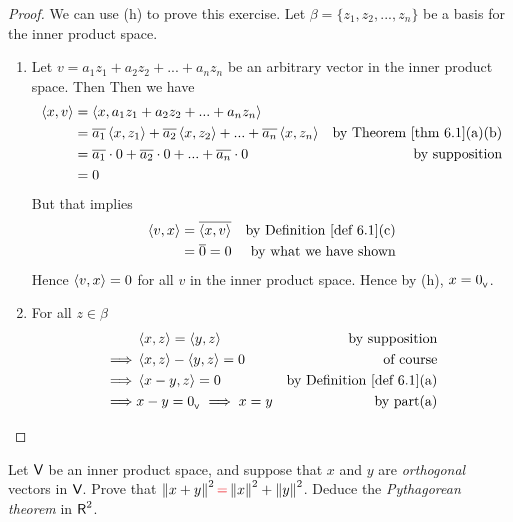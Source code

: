 \begin{proof}
We can use (h) to prove this exercise.
Let \(\beta = \{ z_1, z_2, ..., z_n \}\) be a basis for the inner product space.
\begin{enumerate}
\item Let \(v = a_1 z_1 + a_2 z_2 + ... + a_n z_n\) be an arbitrary vector in the inner product space.
Then Then we have
\begin{align*}
    \LG x, v \RG & = \LG x, a_1 z_1 + a_2 z_2 + ... + a_n z_n \RG \\
        & = \conjugatet{a_1} \LG x, z_1 \RG + \conjugatet{a_2} \LG x, z_2 \RG + ... + \conjugatet{a_n} \LG x, z_n \RG & \text{by \THM{6.1}(a)(b)} \\
        & = \conjugatet{a_1} \cdot 0 + \conjugatet{a_2} \cdot 0 + ... + \conjugatet{a_n} \cdot 0 & \text{by supposition} \\
        & = 0
\end{align*}
But that implies
\begin{align*}
    \LG v, x \RG & = \conjugatet{\LG x, v \RG} & \text{by \DEF{6.1}(c)} \\
        & = \conjugatet{0} = 0 & \text{by what we have shown}
\end{align*}
Hence \(\left< v, x \right> = 0\) for all \(v\) in the inner product space.
Hence by (h), \(x = 0_{_{\textsf{V}}}\).

\item For all \(z \in \beta\)
\begin{align*}
             & \LG x, z \RG = \LG y, z \RG & \text{by supposition} \\
    \implies & \LG x, z \RG - \LG y, z \RG = 0 & \text{of course} \\
    \implies & \LG x - y, z \RG = 0 & \text{by \DEF{6.1}(a)} \\
    \implies & x - y = \OV \implies x = y & \text{by part(a)}
\end{align*}
\end{enumerate}
\end{proof}

\begin{exercise} \label{exercise 6.1.10}
Let \(\textsf{V}\) be an inner product space, and suppose that \(x\) and \(y\) are \emph{orthogonal} vectors in \(\textsf{V}\).
Prove that \(\norm{x + y}^2 \RED{=} \norm{x}^2 + \norm{y}^2\).
Deduce the \emph{Pythagorean theorem} in \(\textsf{R}^2\).
\end{exercise}

